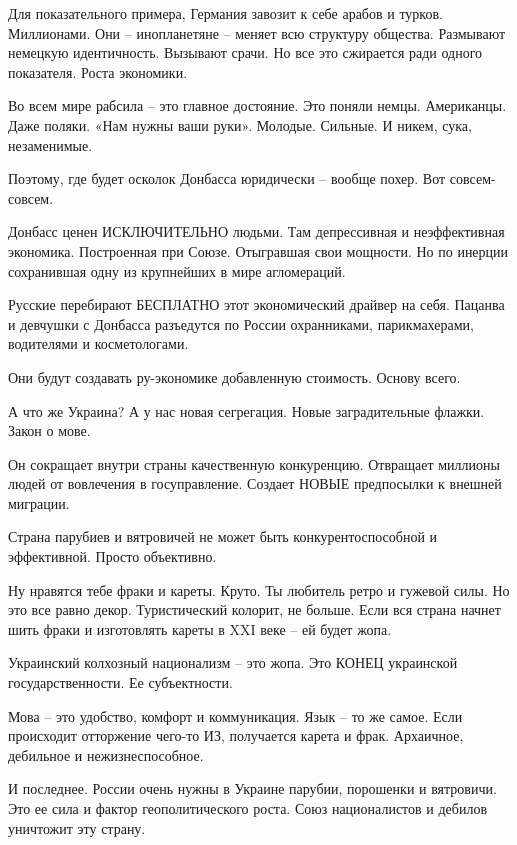 Для показательного примера, Германия завозит к себе арабов и турков.
Миллионами. Они – инопланетяне – меняет всю структуру общества. Размывают
немецкую идентичность. Вызывают срачи. Но все это сжирается ради одного
показателя. Роста экономики.

Во всем мире рабсила – это главное достояние. Это поняли немцы. Американцы.
Даже поляки. «Нам нужны ваши руки». Молодые. Сильные. И никем, сука,
незаменимые.

Поэтому, где будет осколок Донбасса юридически – вообще похер. Вот
совсем-совсем.

Донбасс ценен ИСКЛЮЧИТЕЛЬНО людьми. Там депрессивная и неэффективная экономика.
Построенная при Союзе. Отыгравшая свои мощности. Но по инерции сохранившая одну
из крупнейших в мире агломераций.

Русские перебирают БЕСПЛАТНО этот экономический драйвер на себя. Пацанва и
девчушки с Донбасса разъедутся по России охранниками, парикмахерами, водителями
и косметологами.

Они будут создавать ру-экономике добавленную стоимость. Основу всего.

А что же Украина? А у нас новая сегрегация. Новые заградительные флажки. Закон
о мове.

Он сокращает внутри страны качественную конкуренцию. Отвращает миллионы людей
от вовлечения в госуправление. Создает НОВЫЕ предпосылки к внешней миграции.

Страна парубиев и вятровичей не может быть конкурентоспособной и эффективной.
Просто объективно.

Ну нравятся тебе фраки и кареты. Круто. Ты любитель ретро и гужевой силы. Но
это все равно декор. Туристический колорит, не больше. Если вся страна начнет
шить фраки и изготовлять кареты в XXI веке – ей будет жопа.

Украинский колхозный национализм – это жопа. Это КОНЕЦ украинской
государственности. Ее субъектности.

Мова – это удобство, комфорт и коммуникация. Язык – то же самое. Если
происходит отторжение чего-то ИЗ, получается карета и фрак. Архаичное,
дебильное и нежизнеспособное.

И последнее. России очень нужны в Украине парубии, порошенки и вятровичи. Это
ее сила и фактор геополитического роста. Союз националистов и дебилов уничтожит
эту страну.

